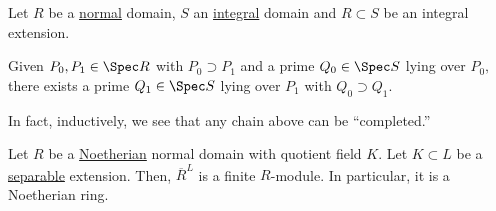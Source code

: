 \documentclass[12pt]{article}	%
\begin{document}
\begin{thm}
	Let $R$ be a \underline{normal} domain, $S$ an \underline{integral} domain and $R \subset S$ be an integral extension.

	Given $P_0, P_1 \in \Spec R$ with $P_0 \supset P_1$ and a prime $Q_0 \in \Spec S$ lying over $P_0,$ there exists a prime $Q_1 \in \Spec S$ lying over $P_1$ with $Q_0 \supset Q_1.$
\end{thm}
\begin{center}
\end{center}

In fact, inductively, we see that any chain above can be ``completed.''

\begin{center}
\end{center}

\begin{thm}
	Let $R$ be a \underline{Noetherian} normal domain with quotient field $K.$ Let $K \subset L$ be a \underline{separable} extension. Then, $\overline{R}^L$ is a finite $R$-module. In particular, it is a Noetherian ring.
\end{thm}
\end{document}

